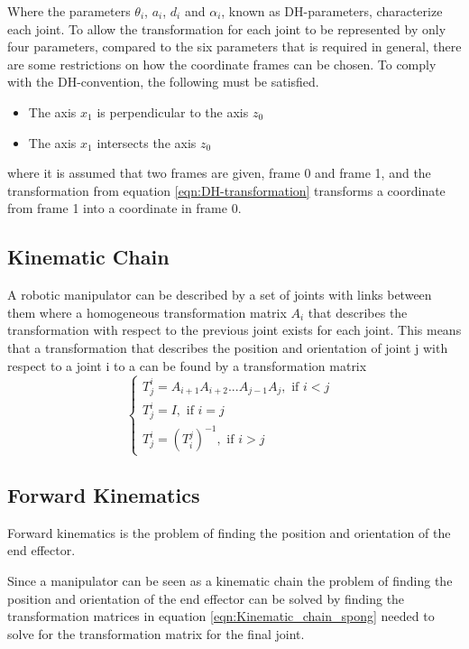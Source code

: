 Where the parameters \(\theta_i\), \(a_i\), \(d_i\) and \(\alpha_i\), known as DH-parameters, characterize each joint. To allow the transformation for each joint to be represented by only four parameters, compared to the six parameters that is required in general, there are some restrictions on how the coordinate frames can be chosen. To comply with the DH-convention, the following must be satisfied.
\begin{itemize}
    \item The axis \(x_{1}\) is perpendicular to the axis \(z_0\)
    \item The axis \(x_{1}\) intersects the axis \(z_0\)
\end{itemize}
where it is assumed that two frames are given, frame 0 and frame 1, and the transformation from equation \ref{eqn:DH-transformation} transforms a coordinate from frame 1 into a coordinate in frame 0.\cite{spong}



\subsection*{Kinematic Chain} %
A robotic manipulator can be described by a set of joints with links between them where a homogeneous transformation matrix \(A_i\) that describes the transformation with respect to the previous joint exists for each joint. This means that a transformation that describes the position and orientation of joint j with respect to a joint i to a can be found by a transformation matrix \cite{spong}
\begin{equation}
    \begin{cases}
        T_j^i = A_{i+1}A_{i+2}...A_{j-1}A_{j}, \text{  if \(i < j\) } \\
        T_j^i = I, \text{  if \(i = j\) } \\
        T_j^i = (T_i^j)^{-1}, \text{  if \(i > j\) }
    \end{cases}
    \label{eqn:Kinematic_chain_spong}
\end{equation}



\subsection*{Forward Kinematics}
Forward kinematics is the problem of finding the position and orientation of the end effector.

Since a manipulator can be seen as a kinematic chain the problem of finding the position and orientation of the end effector can be solved by finding the transformation matrices in equation \ref{eqn:Kinematic_chain_spong} needed to solve for the transformation matrix for the final joint.




